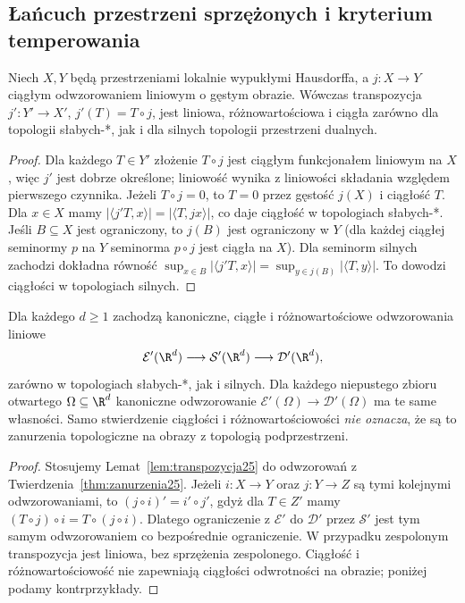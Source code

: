 \subsection{Łańcuch przestrzeni sprzężonych i kryterium temperowania}

\begin{lemat}
\label{lem:transpozycja25}
Niech $X,Y$ będą przestrzeniami lokalnie wypukłymi
Hausdorffa, a $j:X\to Y$ ciągłym odwzorowaniem liniowym
o gęstym obrazie. Wówczas transpozycja
$j':Y'\to X'$, $j'(T)=T\circ j$, jest liniowa,
różnowartościowa i ciągła zarówno dla topologii słabych-*, jak i dla
silnych topologii przestrzeni dualnych.
\end{lemat}
\begin{proof}
Dla każdego $T\in Y'$ złożenie $T\circ j$ jest ciągłym
funkcjonałem liniowym na $X$, więc $j'$ jest dobrze
określone; liniowość wynika z liniowości składania
względem pierwszego czynnika. Jeżeli $T\circ j=0$,
to $T=0$ przez gęstość $j(X)$ i ciągłość $T$.
Dla $x\in X$ mamy
$|\langle j'T,x\rangle|=|\langle T,jx\rangle|$,
co daje ciągłość w topologiach słabych-*.
Jeśli $B\subseteq X$ jest ograniczony, to $j(B)$ jest
ograniczony w $Y$ (dla każdej ciągłej seminormy $p$
na $Y$ seminorma $p\circ j$ jest ciągła na $X$).
Dla seminorm silnych zachodzi dokładna równość
$\sup_{x\in B}|\langle j'T,x\rangle|
= \sup_{y\in j(B)}|\langle T,y\rangle|$.
To dowodzi ciągłości w topologiach silnych.
\end{proof}

\begin{wniosek}
\label{cor:dual-lancuch25}
Dla każdego $d\ge1$ zachodzą kanoniczne, ciągłe i
różnowartościowe odwzorowania liniowe
\[
 \mathcal E'(\R^d)\longrightarrow\mathcal S'(\R^d)
 \longrightarrow\mathcal D'(\R^d),
\]
zarówno w topologiach słabych-*, jak i silnych.
Dla każdego niepustego zbioru otwartego $\Omega\subseteq\R^d$
kanoniczne odwzorowanie
$\mathcal E'(\Omega)\to\mathcal D'(\Omega)$
ma te same własności. Samo stwierdzenie ciągłości i
różnowartościowości \emph{nie oznacza}, że są to zanurzenia
topologiczne na obrazy z topologią podprzestrzeni.
\end{wniosek}
\begin{proof}
Stosujemy Lemat~\ref{lem:transpozycja25} do odwzorowań
z Twierdzenia~\ref{thm:zanurzenia25}. Jeżeli $i:X\to Y$
oraz $j:Y\to Z$ są tymi kolejnymi odwzorowaniami,
to $(j\circ i)'=i'\circ j'$, gdyż dla $T\in Z'$
mamy $(T\circ j)\circ i=T\circ(j\circ i)$.
Dlatego ograniczenie z $\mathcal E'$ do $\mathcal D'$
przez $\mathcal S'$ jest tym samym odwzorowaniem co
bezpośrednie ograniczenie. W przypadku zespolonym
transpozycja jest liniowa, bez sprzężenia zespolonego.
Ciągłość i różnowartościowość nie zapewniają ciągłości
odwrotności na obrazie; poniżej podamy kontrprzykłady.
\end{proof}
